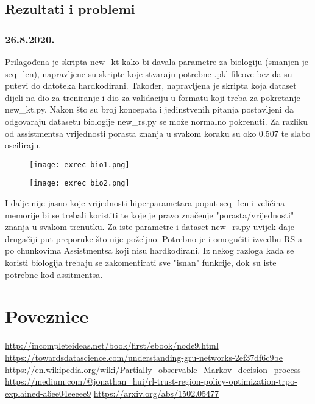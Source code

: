 \subsection{Rezultati i problemi}
 	\subsubsection{26.8.2020.}
 		Prilagođena je skripta new\_kt kako bi davala parametre za biologiju (smanjen je seq\_len), napravljene su skripte koje stvaraju potrebne .pkl fileove bez da su putevi do datoteka hardkodirani. Također, napravljena je skripta koja dataset dijeli na dio za treniranje i dio za validaciju u formatu koji treba za pokretanje new\_kt.py. Nakon što su broj koncepata i jedinstvenih pitanja postavljeni da odgovaraju datasetu biologije new\_rs.py se može normalno pokrenuti.
\newline
Za razliku od assistmentsa vrijednosti porasta znanja u svakom koraku su oko 0.507 te slabo osciliraju.
 		\begin{figure}[!htb]
 			\centering
 			\texttt{[image: exrec\_bio1.png]}
 			\caption{}
 			\label{}
 		\end{figure}
 	
 	\begin{figure}[!htb]
 		\centering
 		\texttt{[image: exrec\_bio2.png]}
 		\caption{}
 		\label{}
 	\end{figure}
 
 	I dalje nije jasno koje vrijednosti hiperparametara poput seq\_len i veličina memorije bi se trebali koristiti te koje je pravo značenje "porasta/vrijednosti" znanja u svakom trenutku. Za iste parametre i dataset new\_rs.py uvijek daje drugačiji put preporuke što nije poželjno. Potrebno je i omogućiti izvedbu RS-a po chunkovima Assistmentsa koji nisu hardkodirani. Iz nekog razloga kada se koristi biologija trebaju se zakomentirati sve "isnan" funkcije, dok su iste potrebne kod assitmentsa.

\section{Poveznice}
\url{http://incompleteideas.net/book/first/ebook/node9.html}
\url{https://towardsdatascience.com/understanding-gru-networks-2ef37df6c9be}
\url{https://en.wikipedia.org/wiki/Partially_observable_Markov_decision_process}
\url{https://medium.com/@jonathan_hui/rl-trust-region-policy-optimization-trpo-explained-a6ee04eeeee9}
\url{https://arxiv.org/abs/1502.05477}

